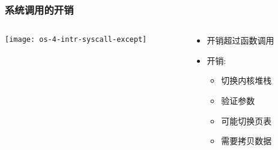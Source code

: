 \begin{frame}
	\frametitle{系统调用的开销}

	\begin{columns}
	
	\begin{column}{0.45\textwidth}
		\centering
		\texttt{[image: os-4-intr-syscall-except]}
		
	\end{column}
	
	\begin{column}{0.5\textwidth}
		
	\begin{itemize}
        \item 开销超过函数调用 \pause
        \item 开销:
	    \begin{itemize}

	        \item 切换内核堆栈
	        \item 验证参数
	        \item 可能切换页表
        	\item 需要拷贝数据

    	\end{itemize}
	\end{itemize}

	\end{column}

\end{columns}

\end{frame}


